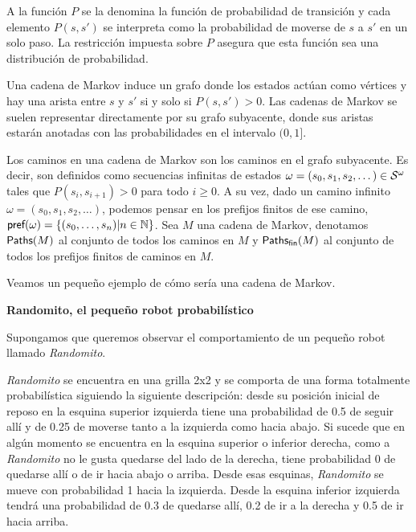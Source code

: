 A la función $P$ se la denomina la función de probabilidad de transición y cada
elemento $P(s, s')$ se interpreta como la probabilidad de moverse de $s$ a $s'$
en un solo paso. La restricción impuesta sobre $P$ asegura que esta función sea
una distribución de probabilidad.


Una cadena de Markov induce un grafo donde los estados actúan como vértices y
hay una arista entre $s$ y $s'$ si y solo si $P(s, s') > 0$. Las cadenas de
Markov se suelen representar directamente por su grafo subyacente, donde sus
aristas estarán anotadas con las probabilidades en el intervalo $(0, 1]$.

Los caminos en una cadena de Markov son los caminos en el grafo subyacente. Es
decir, son definidos como secuencias infinitas de estados $\omega = (s_0, s_1,
	s_2, \dots) \in \mathcal{S}^\omega$ tales que $P(s_i, s_{i+1}) > 0 $ para todo $i \geq
	0$. A su vez, dado un camino infinito $\omega = (s_0, s_1, s_2, \dots)$,
podemos pensar en los prefijos finitos de ese camino, $\textsf{pref}(\omega) =
	\{(s_0, \dots, s_n) | n \in \mathbb{N}\}$. Sea $M$ una cadena de Markov,
denotamos $\textsf{Paths}(M)$ al conjunto de todos los caminos en $M$ y $\textsf{Paths}_\textsf{fin}(M)$
al conjunto de todos los prefijos finitos de caminos en $M$.

Veamos un pequeño ejemplo de cómo sería una cadena de Markov.

\textbf{Randomito, el pequeño robot probabilístico}

Supongamos que queremos observar el comportamiento de un pequeño robot llamado
\textit{Randomito}.

\textit{Randomito} se encuentra en una grilla 2x2 y se comporta de una forma totalmente probabilística siguiendo la siguiente descripción: desde su posición inicial de reposo en la esquina superior izquierda tiene una probabilidad de 0.5 de seguir allí y de 0.25 de moverse tanto a la izquierda como hacia abajo. Si sucede que en algún momento se encuentra en la esquina superior o inferior derecha, como a \emph{Randomito} no le gusta quedarse del lado de la derecha, tiene probabilidad 0 de quedarse allí o de ir hacia abajo o arriba. Desde esas esquinas, \emph{Randomito} se mueve con probabilidad 1 hacia la izquierda. Desde la esquina inferior izquierda tendrá una probabilidad de 0.3 de quedarse allí, 0.2 de ir a la derecha y 0.5 de ir hacia arriba.

